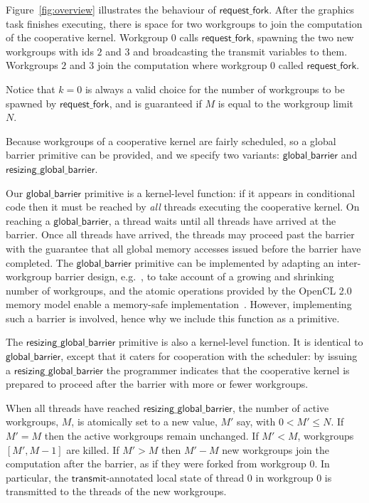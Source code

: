 \documentclass[sigconf]{acmart}
\newcommand{\myfiglong}{Figure~}
\newcommand{\mysec}{Sec.~}
\newcommand{\transmit}{\mathsf{transmit}}
\newcommand{\offerfork}{\mathsf{request\_fork}}
\newcommand{\globalbarrier}{\mathsf{global\_barrier}}
\newcommand{\resizingglobalbarrier}{\mathsf{resizing\_global\_barrier}}
\begin{document}
{\myfiglong{\ref{fig:overview}} illustrates the behaviour of
$\offerfork$. After the graphics task finishes executing, there is
space for two workgroups to join the computation of the cooperative
kernel. Workgroup $0$ calls $\offerfork$, spawning the two new
workgroups with ids $2$ and $3$ and broadcasting the transmit
variables to them. Workgroups $2$ and $3$ join the computation where
workgroup $0$ called $\offerfork$.


Notice that $k=0$ is always a valid choice for the number of
workgroups to be spawned by $\offerfork$, and is guaranteed if $M$ is
equal to the workgroup limit $N$.

%
Because workgroups of a cooperative kernel are fairly scheduled, so a
global barrier primitive can be provided, and we specify two variants: $\globalbarrier$
and $\resizingglobalbarrier$.

Our $\globalbarrier$ primitive is a kernel-level function: if it
appears in conditional code then it must be reached by \emph{all}
threads executing the cooperative kernel.  On reaching a
$\globalbarrier$, a thread waits until all threads have arrived at
the barrier.  Once all threads have arrived, the threads may proceed
past the barrier with the guarantee that all global memory accesses
issued before the barrier have completed.  The $\globalbarrier$
primitive can be implemented by adapting an inter-workgroup barrier
design, e.g.~\cite{XF10}, to take account of a growing and shrinking number of workgroups, and the atomic operations provided by
the OpenCL 2.0 memory model enable a memory-safe
implementation~\cite{DBLP:conf/oopsla/SorensenDBGR16}.  However, implementing such a barrier is
involved, hence why we include this function as a primitive.

The $\resizingglobalbarrier$ primitive is also a kernel-level
function.  It is identical to $\globalbarrier$, except that it caters
for cooperation with the scheduler: by issuing a
$\resizingglobalbarrier$ the programmer indicates that the cooperative
kernel is prepared to proceed after the barrier with more or fewer workgroups.

When all threads have reached $\resizingglobalbarrier$,
the number of active workgroups, $M$, is atomically set to a new value, $M'$ say, with $0 < M' \leq N$.
If $M' = M$ then the active workgroups remain unchanged.  If $M' < M$, workgroups $[M', M-1]$ are
killed.  If $M' > M$ then $M'-M$ new workgroups join the computation after the barrier,
as if they were forked from workgroup 0.  In particular, the
$\transmit$-annotated local state of thread 0 in workgroup 0 is
transmitted to the threads of the new workgroups.

}
\end{document}
